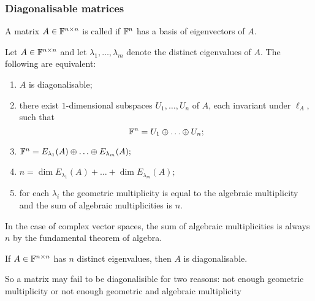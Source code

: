 \subsubsection{Diagonalisable matrices}
\begin{definition}
A matrix $A\in\mathbb{F}^{n\times n}$ is called  if $\mathbb{F}^n$ has a basis of eigenvectors of $A$.
\end{definition}
\begin{proposition}
Let $A\in\mathbb{F}^{n\times n}$ and let $\lambda_1,\ldots, \lambda_m$ denote the distinct eigenvalues of $A$. The following are equivalent:
\begin{enumerate}
\item $A$ is diagonalisable;
\item there exist $1$-dimensional subspaces $U_1,\ldots, U_n$ of $A$, each invariant under $\ell_A$, such that
\[ \mathbb{F}^n = U_1\oplus \ldots \oplus U_n; \]
\item $\mathbb{F}^n = E_{\lambda_1}(A) \oplus \ldots \oplus E_{\lambda_m}(A);$
\item $n = \dim E_{\lambda_1}(A) + \ldots + \dim E_{\lambda_m}(A);$
\item for each $\lambda_i$ the geometric multiplicity is equal to the algebraic multiplicity and the sum of algebraic multiplicities is $n$.
\end{enumerate}
\end{proposition}
In the case of complex vector spaces, the sum of algebraic multiplicities is always $n$ by the fundamental theorem of algebra.
\begin{corollary}
If $A\in\mathbb{F}^{n\times n}$ has $n$ distinct eigenvalues, then $A$ is diagonalisable.
\end{corollary}
So a matrix may fail to be diagonalisible for two reasons: not enough geometric multiplicity or not enough geometric and algebraic multiplicity

